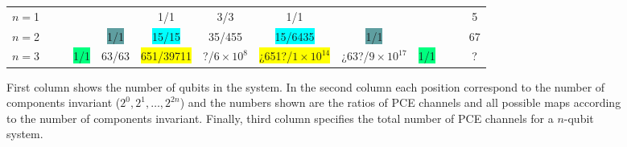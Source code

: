 \documentclass[11pt,dvipsnames]{article} %
\newcommand{\1}{\mathds{1}}
\begin{document}
\begin{itemize}
\begin{figure}[H]%
	\centering
	\begin{tabular}{>{$n=$}l<{\hfill}*{12}{c}}
1 &&&&&\colorbox{Apricot}{1/1}&3/3&\colorbox{Apricot}{1/1}&&&&&5\\
2 &&&&\colorbox{CadetBlue}{1/1}&\colorbox{Cyan}{15/15}&35/455&\colorbox{Cyan}{15/6435}&\colorbox{CadetBlue}{1/1}&&&&67\\
3 &&&\colorbox{SpringGreen}{1/1}&\colorbox{RedOrange}{63/63}&\colorbox{Yellow}{651/39711}&?/$6\times 10^8$&\colorbox{Yellow}{¿651?/$1\times 10^{14}$}&
\colorbox{RedOrange}{¿63?/$9\times 10^{17}$}&\colorbox{SpringGreen}{1/1}&&&?
\end{tabular}
\caption{First column shows the number of qubits in the system.  In the second
column each position correspond to the number of components invariant ($2^0,
2^1, \ldots, 2^{2n}$) and the numbers shown are the ratios of PCE channels
and all possible maps according to the number of components invariant.  Finally, third column
specifies the total number of PCE channels for a $n$-qubit system.}
\label{fig:CCs-by-components}
\end{figure} %


\end{itemize}
\end{document}
